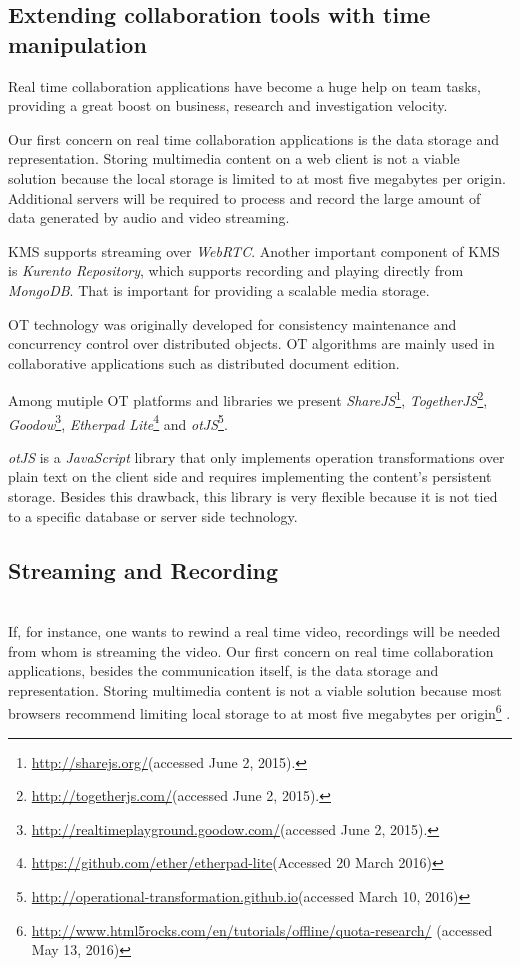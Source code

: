 \documentclass[10pt,conference]{IEEEtran}
\begin{document}
 
\subsection{Extending collaboration tools with time manipulation}
\label{collab}

Real time collaboration applications have become a huge help on team tasks, providing a great boost on business, research and investigation velocity.

 Our first concern on real time collaboration applications is the data storage and representation. Storing multimedia content on a web client is not a viable solution because the local storage is limited to at most five megabytes per origin. Additional servers will be required to process and record the large amount of data generated by audio and video streaming.
 
\gls{KMS} supports streaming over \emph{WebRTC}. Another important component of \gls{KMS} is \emph{Kurento Repository}, which supports recording and playing directly from \emph{MongoDB}. That is important for providing a scalable media storage. 
	
     \gls{OT} technology was originally developed for consistency maintenance and concurrency control over distributed objects.
     \gls{OT} algorithms are mainly used in collaborative applications such as distributed document edition.

	Among mutiple \gls{OT} platforms and libraries we present \emph{ShareJS}\footnote{\url{http://sharejs.org/}(accessed June 2, 2015).}, \emph{TogetherJS}\footnote{\url{http://togetherjs.com/}(accessed June 2, 2015).}, \emph{Goodow}\footnote{\url{http://realtimeplayground.goodow.com/}(accessed June 2, 2015).}, \emph{Etherpad Lite}\footnote{\url{https://github.com/ether/etherpad-lite}(Accessed 20 March 2016)} and \emph{otJS}\footnote{\url{http://operational-transformation.github.io}(accessed March 10, 2016)}.


	\emph{otJS} is a \emph{JavaScript} library that only implements operation transformations over plain text on the client side and requires implementing the content's persistent storage. Besides this drawback, this library is very flexible because it is not tied to a specific database or server side technology.
        

\subsection{Streaming and Recording}\label{recstream}~\\
	If, for instance, one wants to rewind a real time video, recordings will be needed from whom is streaming the video. 
 Our first concern on real time collaboration applications, besides the communication itself, is the data storage and representation. Storing multimedia content is not a viable solution because most browsers recommend limiting local storage to at most five megabytes per origin\footnote{\url{http://www.html5rocks.com/en/tutorials/offline/quota-research/} (accessed May 13, 2016)} .
\end{document}
